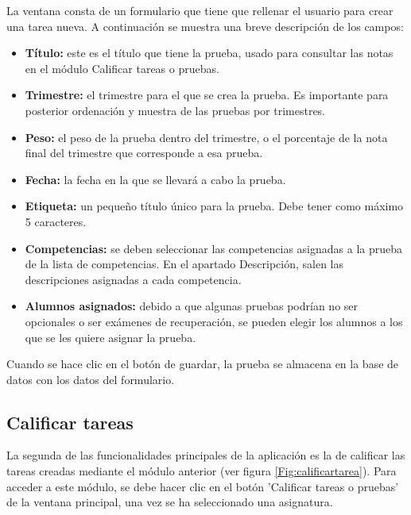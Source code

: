 La ventana consta de un formulario que tiene que rellenar el usuario para crear una tarea nueva. A continuación se muestra una breve descripción de los campos:
\begin{itemize}
	\item \textbf{Título:} este es el título que tiene la prueba, usado para consultar las notas en el módulo Calificar tareas o pruebas.
	\item \textbf{Trimestre:} el trimestre para el que se crea la prueba. Es importante para posterior ordenación y muestra de las pruebas por trimestres.
	\item \textbf{Peso:} el peso de la prueba dentro del trimestre, o el porcentaje de la nota final del trimestre que corresponde a esa prueba.
	\item \textbf{Fecha:} la fecha en la que se llevará a cabo la prueba.
	\item \textbf{Etiqueta:} un pequeño título único para la prueba. Debe tener como máximo 5 caracteres.
	\item \textbf{Competencias:} se deben seleccionar las competencias asignadas a la prueba de la lista de competencias. En el apartado Descripción, salen las descripciones asignadas a cada competencia.
	\item \textbf{Alumnos asignados:} debido a que algunas pruebas podrían no ser opcionales o ser exámenes de recuperación, se pueden elegir los alumnos a los que se les quiere asignar la prueba.
\end{itemize}

Cuando se hace clic en el botón de guardar, la prueba se almacena en la base de datos con los datos del formulario.


\subsection{Calificar tareas}
La segunda de las funcionalidades principales de la aplicación es la de calificar las tareas creadas mediante el módulo anterior (ver figura \ref{Fig:calificartarea}). Para acceder a este módulo, se debe hacer clic en el botón 'Calificar tareas o pruebas' de la ventana principal, una vez se ha seleccionado una asignatura.

